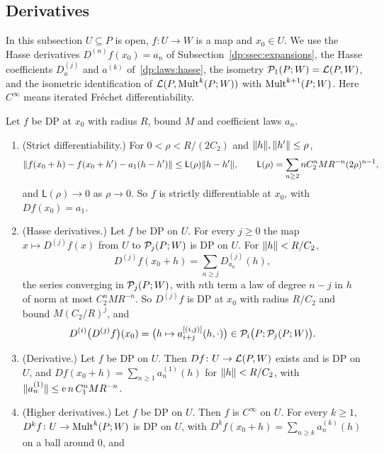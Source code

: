 \subsection{Derivatives}\label{dp:ssec:derivatives}

In this subsection $U\subseteq P$ is open, $f\colon U\to W$ is a map and $x_0\in U$. We use the Hasse derivatives $D^{(n)}f(x_0)=a_n$ of Subsection~\ref{dp:ssec:expansions}, the Hasse coefficients $D^{(j)}_a$ and $a^{(k)}$ of~\eqref{dp:laws:hasse}, the isometry $\mathcal P_1(P;W)=\mathcal L(P,W)$, and the isometric identification of $\mathcal L(P,\operatorname{Mult}^k(P;W))$ with $\operatorname{Mult}^{k+1}(P;W)$. Here $C^\infty$ means iterated Fr\'echet differentiability.

\begin{theorem}[differentiability]\label{dp:thm:differentiable}
Let $f$ be DP at $x_0$ with radius $R$, bound $M$ and coefficient laws $a_n$.
\begin{enumerate}
\item \textup{(Strict differentiability.)} For $0<\rho<R/(2C_2)$ and $\lVert h\rVert,\lVert h'\rVert\le\rho$,
\begin{equation}\label{dp:4b:eq:strict}
 \lVert f(x_0+h)-f(x_0+h')-a_1(h-h')\rVert\le\mathsf L(\rho)\lVert h-h'\rVert,\qquad
 \mathsf L(\rho)=\sum_{n\ge2}nC_2^nMR^{-n}(2\rho)^{n-1},
\end{equation}
and $\mathsf L(\rho)\to0$ as $\rho\to0$. So $f$ is strictly differentiable at $x_0$, with $Df(x_0)=a_1$.
\item \textup{(Hasse derivatives.)} Let $f$ be DP on $U$. For every $j\ge0$ the map $x\mapsto D^{(j)}f(x)$ from $U$ to $\mathcal P_j(P;W)$ is DP on $U$. For $\lVert h\rVert<R/C_2$,
\begin{equation}\label{dp:4b:eq:hasse-expansion}
 D^{(j)}f(x_0+h)=\sum_{n\ge j}D^{(j)}_{a_n}(h),
\end{equation}
the series converging in $\mathcal P_j(P;W)$, with $n$th term a law of degree $n-j$ in $h$ of norm at most $C_2^nMR^{-n}$. So $D^{(j)}f$ is DP at $x_0$ with radius $R/C_2$ and bound $M(C_2/R)^j$, and
\begin{equation}\label{dp:4b:eq:hasse-iterated-law}
 D^{(i)}\bigl(D^{(j)}f\bigr)(x_0)=\bigl(h\mapsto a_{i+j}^{[(i,j)]}(h,\cdot)\bigr)\in\mathcal P_i\bigl(P;\mathcal P_j(P;W)\bigr).
\end{equation}
\item \textup{(Derivative.)} Let $f$ be DP on $U$. Then $Df\colon U\to\mathcal L(P,W)$ exists and is DP on $U$, and $Df(x_0+h)=\sum_{n\ge1}a_n^{(1)}(h)$ for $\lVert h\rVert<R/C_2$, with $\lVert a_n^{(1)}\rVert\le\mathrm e\,n\,C_1^nMR^{-n}$.
\item \textup{(Higher derivatives.)} Let $f$ be DP on $U$. Then $f$ is $C^\infty$ on $U$. For every $k\ge1$, $D^kf\colon U\to\operatorname{Mult}^k(P;W)$ is DP on $U$, with $D^kf(x_0+h)=\sum_{n\ge k}a_n^{(k)}(h)$ on a ball around $0$, and

\end{enumerate}
\end{theorem}
